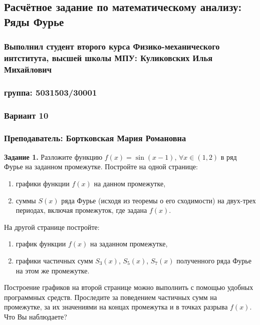 \documentclass[a4paper, 12pt]{article}
\begin{document}
	\begin{center}
		\subsection*{Расчётное задание по математическому анализу: Ряды Фурье}
		\subsubsection*{Выполнил студент второго курса Физико-механического интститута, высшей школы МПУ: Куликовских Илья Михайлович}
		\subsubsection*{группа: 5031503/30001}
		\subsubsection*{Вариант 10}
		\subsubsection*{Преподаватель: Бортковская Мария Романовна}
	\end{center}
	
	\quad \textbf{Задание 1.}  Разложите функцию $f(x) = \sin(x-1)$, $\forall x \in (1, 2)$ в ряд Фурье на заданном промежутке. Постройте на одной странице:
	
	\begin{enumerate}
		\item графики функции $f(x)$ на данном промежутке,
		\item суммы $S(x)$ ряда Фурье (исходя из теоремы о его сходимости) на двух-трех периодах, включая промежуток, где задана $f(x)$.
	\end{enumerate}
	
	На другой странице постройте:
	\begin{enumerate}
		\item график функции $f(x)$ на заданном промежутке,
		\item графики частичных сумм $S_3(x)$, $S_5(x)$, $S_7(x)$ полученного ряда Фурье на этом же промежутке.
	\end{enumerate}
	
	Построение графиков на второй странице можно выполнить с помощью удобных программных средств. Проследите за поведением частичных сумм на промежутке, за их значениями на концах промежутка и в точках разрыва $f(x)$. Что Вы наблюдаете?
	
\end{document}
